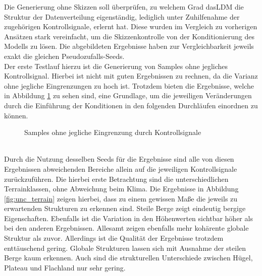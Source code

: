 Die Generierung ohne Skizzen soll überprüfen, zu welchem Grad das\ac{LDM} die Struktur der Datenverteilung eigenständig, lediglich unter Zuhilfenahme der zugehörigen Kontrollsignale, erlernt hat. Diese wurden im Vergleich zu vorherigen Ansätzen stark vereinfacht, um die Skizzenkontrolle von der Konditionierung des Modells zu lösen. Die abgebildeten Ergebnisse haben zur Vergleichbarkeit jeweils exakt die gleichen Pseudozufalls-Seeds. \\
Der erste Testlauf hierzu ist die Generierung von Samples ohne jegliches Kontrollsignal. Hierbei ist nicht mit guten Ergebnissen zu rechnen, da die Varianz ohne jegliche Eingrenzungen zu hoch ist. Trotzdem bieten die Ergebnisse, welche in Abbildung \ref{fig:unc_terrain_noclass} zu sehen sind, eine Grundlage, um die jeweiligen Veränderungen durch die Einführung der Konditionen in den folgenden Durchläufen einordnen zu können.
\begin{figure}[htbp]
    \centering
    \caption{Samples ohne jegliche Eingrenzung durch Kontrollsignale}
    \label{fig:unc_terrain_noclass}
\end{figure} \\
Durch die Nutzung desselben Seeds für die Ergebnisse sind alle von diesen Ergebnissen abweichenden Bereiche allein auf die jeweiligen Kontrollsignale zurückzuführen. Die hierbei erste Betrachtung sind die unterschiedlichen Terrainklassen, ohne Abweichung beim Klima. Die Ergebnisse in Abbildung \ref{fig:unc_terrain} zeigen hierbei, dass zu einem gewissen Maße die jeweils zu erwartenden Strukturen zu erkennen sind. Steile Berge zeigt eindeutig bergige Eigenschaften. Ebenfalls ist die Variation in den Höhenwerten sichtbar höher als bei den anderen Ergebnissen. Allesamt zeigen ebenfalls mehr kohärente globale Struktur als zuvor. Allerdings ist die Qualität der Ergebnisse trotzdem enttäuschend gering. Globale Strukturen lassen sich mit Ausnahme der steilen Berge kaum erkennen. Auch sind die strukturellen Unterschiede zwischen Hügel, Plateau und Flachland nur sehr gering. 
